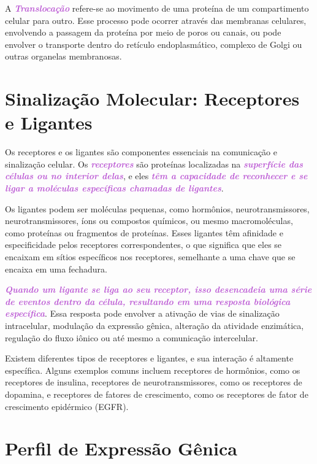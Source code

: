 \documentclass[11pt,a4paper]{article}
\newcounter{exemplo}
\begin{document}
	A \textcolor{MediumOrchid}{\textbf{\textit{Translocação}}} refere-se ao movimento de uma proteína de um compartimento celular para outro. Esse processo pode ocorrer através das membranas celulares, envolvendo a passagem da proteína por meio de poros ou canais, ou pode envolver o transporte dentro do retículo endoplasmático, complexo de Golgi ou outras organelas membranosas.

\section{Sinalização Molecular: Receptores e Ligantes}

	Os receptores e os ligantes são componentes essenciais na comunicação e sinalização celular. Os \textcolor{MediumOrchid}{\textbf{\textit{receptores}}} são proteínas localizadas na \textcolor{MediumOrchid}{\textbf{\textit{superfície das células ou no interior delas}}}, e eles \textcolor{MediumOrchid}{\textbf{\textit{têm a capacidade de reconhecer e se ligar a moléculas específicas chamadas de ligantes}}}.

	Os ligantes podem ser moléculas pequenas, como hormônios, neurotransmissores, neurotransmissores, íons ou compostos químicos, ou mesmo macromoléculas, como proteínas ou fragmentos de proteínas. Esses ligantes têm afinidade e especificidade pelos receptores correspondentes, o que significa que eles se encaixam em sítios específicos nos receptores, semelhante a uma chave que se encaixa em uma fechadura.
	
	\textcolor{MediumOrchid}{\textbf{\textit{Quando um ligante se liga ao seu receptor, isso desencadeia uma série de eventos dentro da célula, resultando em uma resposta biológica específica}}}. Essa resposta pode envolver a ativação de vias de sinalização intracelular, modulação da expressão gênica, alteração da atividade enzimática, regulação do fluxo iônico ou até mesmo a comunicação intercelular.

	Existem diferentes tipos de receptores e ligantes, e sua interação é altamente específica. Alguns exemplos comuns incluem receptores de hormônios, como os receptores de insulina, receptores de neurotransmissores, como os receptores de dopamina, e receptores de fatores de crescimento, como os receptores de fator de crescimento epidérmico (EGFR).

\section{Perfil de Expressão Gênica}
\end{document}
